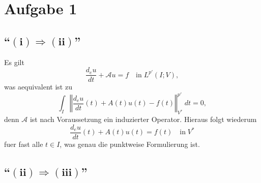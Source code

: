 \documentclass{article}
\begin{document}
\section*{Aufgabe 1}

\subsection*{``$\bm{(i) \Rightarrow (ii)}$''}

Es gilt
\begin{equation*}
  \frac{d_e u}{dt} + \mathcal{A} u = f \quad \text{in} \; L^{p'}(I; V),
\end{equation*}
was aequivalent ist zu
\begin{equation*}
  \int_{I} {\left\Vert \frac{d_e u}{dt}(t) + A(t) u(t) - f(t) \right\Vert}_{V^*}^{p'} \ dt
  = 0,
\end{equation*}
denn $\mathcal{A}$ ist nach Voraussetzung ein induzierter Operator. Hieraus folgt wiederum
\begin{equation*}
  \frac{d_e u}{dt}(t) + A(t) u(t) 
  = f(t) \quad \text{in} \; V^*
\end{equation*}
fuer fast alle $t \in I$, was genau die punktweise Formulierung ist.

\subsection*{``$\bm{(ii) \Rightarrow (iii)}$''}
\end{document}
